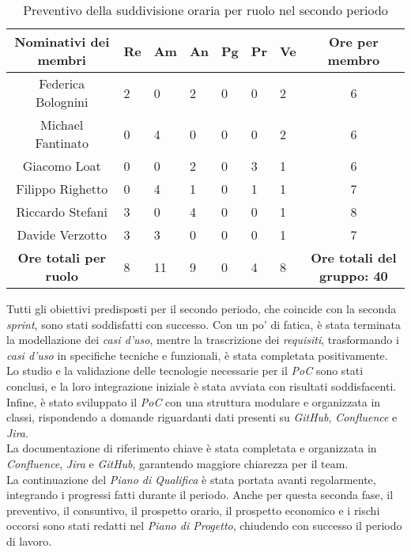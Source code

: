 \begin{table}[h!]
    \centering
    \renewcommand{\arraystretch}{1.5}
    \begin{tabularx}{\textwidth}{|c|X|X|X|X|X|X|c|}\hline
    \rowcolor[HTML]{FFD700} 
    \textbf{Nominativi dei membri} & \textbf{Re} & \textbf{Am} & \textbf{An} & \textbf{Pg} & \textbf{Pr} & \textbf{Ve} & \textbf{Ore per membro} \\ \hline
    Federica Bolognini  & 2 & 0 & 2 & 0 & 0 & 2 & 6 \\ \hline
    Michael Fantinato   & 0 & 4 & 0 & 0 & 0 & 2 & 6 \\ \hline
    Giacomo Loat        & 0 & 0 & 2 & 0 & 3 & 1 & 6 \\ \hline
    Filippo Righetto    & 0 & 4 & 1 & 0 & 1 & 1 & 7 \\ \hline
    Riccardo Stefani    & 3 & 0 & 4 & 0 & 0 & 1 & 8 \\ \hline
    Davide Verzotto     & 3 & 3 & 0 & 0 & 0 & 1 & 7 \\ \hline
    \rowcolor[HTML]{FFD700} 
    \textbf{Ore totali per ruolo} & 8 & 11 & 9 & 0 & 4 & 8 & \textbf{Ore totali del gruppo: 40} \\ \hline
    \end{tabularx}
    \caption{Preventivo della suddivisione oraria per ruolo nel secondo periodo}
\end{table}

Tutti gli obiettivi predisposti per il secondo periodo, che coincide con la seconda \emph{sprint}, sono stati soddisfatti con successo. Con un po' di fatica, è stata terminata la modellazione dei \emph{casi d'uso}, mentre la trascrizione dei \emph{requisiti}, trasformando i \emph{casi d’uso} in specifiche tecniche e funzionali, è stata completata positivamente.\\
Lo studio e la validazione delle tecnologie necessarie per il \emph{PoC} sono stati conclusi, e la loro integrazione iniziale è stata avviata con risultati soddisfacenti. Infine, è stato sviluppato il \emph{PoC} con una struttura modulare e organizzata in classi, rispondendo a domande riguardanti dati presenti su \emph{GitHub}, \emph{Confluence} e \emph{Jira}.\\
La documentazione di riferimento chiave è stata completata e organizzata in \emph{Confluence}, \emph{Jira} e \emph{GitHub}, garantendo maggiore chiarezza per il team.\\
La continuazione del \emph{Piano di Qualifica} è stata portata avanti regolarmente, integrando i progressi fatti durante il periodo. Anche per questa seconda fase, il preventivo, il consuntivo, il prospetto orario, il prospetto economico e i rischi occorsi sono stati redatti nel \textit{Piano di Progetto}, chiudendo con successo il periodo di lavoro.


